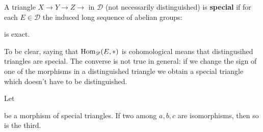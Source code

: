 \begin{defn}
A triangle $X \longrightarrow Y \longrightarrow Z  \longrightarrow$ in $\mathscr{D}$ (not necessarily distinguished) is \textbf{special} if for each $E \in \mathscr{D}$ the induced long sequence of abelian groups:
\begin{center}
\end{center}
is exact.
\end{defn}

To be clear, saying that $\textnormal{Hom}_{\mathscr{D}}(E,*)$ is cohomological means that distingusihed triangles are special. The converse is not true in general: if we change the sign of one of the morphisms in a distinguished triangle we obtain a special triangle which doesn't have to be distinguished.\\

\begin{prop}\label{c}
Let 
\begin{center}
\end{center}
be a morphism of special triangles. If two among $a,b,c$ are isomorphisms, then so is the third. 
\end{prop}

